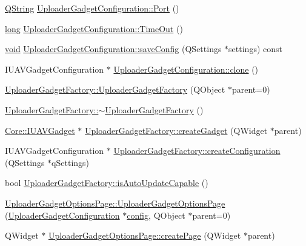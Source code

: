 \begin{DoxyCompactItemize}
\item 
\hyperlink{group___u_a_v_objects_plugin_gab9d252f49c333c94a72f97ce3105a32d}{Q\-String} \hyperlink{group___y_modem_uploader_gabf25c5e3dabcb3c129987a2d266b73dc}{Uploader\-Gadget\-Configuration\-::\-Port} ()
\item 
\hyperlink{ioapi_8h_a3c7b35ad9dab18b8310343c201f7b27e}{long} \hyperlink{group___y_modem_uploader_ga39f15ea85bd2c5de6f4a1a6d71f21032}{Uploader\-Gadget\-Configuration\-::\-Time\-Out} ()
\item 
\hyperlink{group___u_a_v_objects_plugin_ga444cf2ff3f0ecbe028adce838d373f5c}{void} \hyperlink{group___y_modem_uploader_gade32c98be91417bbf87148f4629b5c18}{Uploader\-Gadget\-Configuration\-::save\-Config} (Q\-Settings $\ast$settings) const 
\item 
I\-U\-A\-V\-Gadget\-Configuration $\ast$ \hyperlink{group___y_modem_uploader_gaf15392453c1ff2489f6e03d39d6338e8}{Uploader\-Gadget\-Configuration\-::clone} ()
\item 
\hyperlink{group___y_modem_uploader_ga33e544ad20fa638bbf34e7a461d3306e}{Uploader\-Gadget\-Factory\-::\-Uploader\-Gadget\-Factory} (Q\-Object $\ast$parent=0)
\item 
\hyperlink{group___y_modem_uploader_ga7509287bf0bfbf3b364591ac90155886}{Uploader\-Gadget\-Factory\-::$\sim$\-Uploader\-Gadget\-Factory} ()
\item 
\hyperlink{class_core_1_1_i_u_a_v_gadget}{Core\-::\-I\-U\-A\-V\-Gadget} $\ast$ \hyperlink{group___y_modem_uploader_gaec0b67dc3c2b6c12df29c01be93457fb}{Uploader\-Gadget\-Factory\-::create\-Gadget} (Q\-Widget $\ast$parent)
\item 
I\-U\-A\-V\-Gadget\-Configuration $\ast$ \hyperlink{group___y_modem_uploader_gada950b4297da08d576452a67d7c42f59}{Uploader\-Gadget\-Factory\-::create\-Configuration} (Q\-Settings $\ast$q\-Settings)
\item 
bool \hyperlink{group___y_modem_uploader_ga1c32bfa644ec01ae5f98410b24c7f6fd}{Uploader\-Gadget\-Factory\-::is\-Auto\-Update\-Capable} ()
\item 
\hyperlink{group___y_modem_uploader_gae4988774405776fb8a06744eb25e596a}{Uploader\-Gadget\-Options\-Page\-::\-Uploader\-Gadget\-Options\-Page} (\hyperlink{class_uploader_gadget_configuration}{Uploader\-Gadget\-Configuration} $\ast$\hyperlink{deflate_8c_a4473b5227787415097004fd39f55185e}{config}, Q\-Object $\ast$parent=0)
\item 
Q\-Widget $\ast$ \hyperlink{group___y_modem_uploader_ga8f7e89743cc3fc8f9e866c4ebe859a9f}{Uploader\-Gadget\-Options\-Page\-::create\-Page} (Q\-Widget $\ast$parent)

\end{DoxyCompactItemize}

